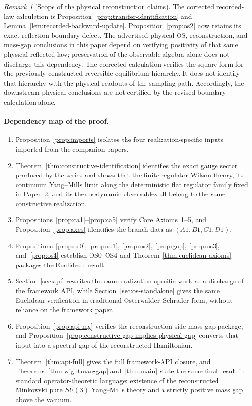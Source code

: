 \documentclass[11pt]{article}
\theoremstyle{definition}
\theoremstyle{remark}
\newtheorem{remark}[theorem]{Remark}
\begin{document}
\begin{remark}[Scope of the physical reconstruction claims]
The corrected recorded-law calculation is
Proposition~\ref{prop:transfer-identification} and
Lemma~\ref{lem:recorded-backward-update}. Proposition~\ref{prop:os2}
now retains its exact reflection boundary defect. The advertised physical
OS, reconstruction, and mass-gap conclusions in this paper depend on
verifying positivity of that same physical reflected law; preservation
of the observable algebra alone does not discharge this dependency.
The corrected calculation verifies the square form for the previously
constructed reversible equilibrium hierarchy. It does not identify that
hierarchy with the physical readouts of the sampling path. Accordingly,
the downstream physical conclusions are not certified by the revised
boundary calculation alone.
\end{remark}


\paragraph{Dependency map of the proof.}
\begin{enumerate}[leftmargin=1.5em]
\item Proposition~\ref{prop:imports} isolates the four realization-specific
inputs imported from the companion papers.
\item Theorem~\ref{thm:constructive-identification} identifies the exact
gauge sector produced by the series and shows that the finite-regulator Wilson
theory, its continuum Yang--Mills limit along the deterministic flat regulator
family fixed in Paper~2, and its thermodynamic observables all
belong to the same constructive realization.
\item Propositions~\ref{prop:ca1}--\ref{prop:ca5} verify Core Axioms~1--5, and
Proposition~\ref{prop:axes} identifies the branch data as $(A1,B1,C1,D1)$.
\item Propositions~\ref{prop:os0}, \ref{prop:os1}, \ref{prop:os2},
\ref{prop:gap}, \ref{prop:os3}, and~\ref{prop:os4} establish OS0--OS4 and
Theorem~\ref{thm:euclidean-axioms} packages the Euclidean result.
\item Section~\ref{sec:api} rewrites the same realization-specific work as a
discharge of the framework API, while Section~\ref{sec:os-standalone} gives the
same Euclidean verification in traditional Osterwalder--Schrader form, without
reliance on the framework paper.
\item Proposition~\ref{prop:api-mg} verifies the reconstruction-side mass-gap
package, and Proposition~\ref{prop:constructive-gap-implies-physical-gap}
converts that input into a spectral gap of the reconstructed Hamiltonian.
\item Theorem~\ref{thm:api-full} gives the full framework-API closure, and
Theorems~\ref{thm:wightman-gap} and~\ref{thm:main} state the same final result
in standard operator-theoretic language: existence of the reconstructed
Minkowski pure $SU(3)$ Yang--Mills theory and a strictly positive mass gap
above the vacuum.
\end{enumerate}
\end{document}
